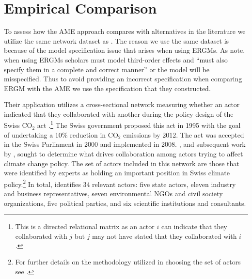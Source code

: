 \documentclass[12pt,pdflatex]{elsarticle}
\begin{document}
\section{\textbf{Empirical Comparison}} 

To assess how the AME approach compares with alternatives in the literature we utilize the same network dataset as \citet{cranmer:etal:2016}. The reason we use the same dataset is because of the model specification issue that arises when using ERGMs. As \citet[p. 8]{cranmer:etal:2016} note, when using ERGMs scholars must model third-order effects and ``must also specify them in a complete and correct manner'' or the model will be misspecified. Thus to avoid providing an incorrect specification when comparing ERGM with the AME we use the specification that they constructed. 

Their application utilizes a cross-sectional network measuring whether an actor indicated that they collaborated with another during the policy design of the Swiss CO$_{2}$ act \citep{ingold:2008}.\footnote{This is a directed relational matrix as an actor $i$ can indicate that they collaborated with $j$ but $j$ may not have stated that they collaborated with $i$.} The Swiss government proposed this act in 1995 with the goal of undertaking a 10\% reduction in CO$_{2}$ emissions by 2012. The act was accepted in the Swiss Parliament in 2000 and implemented in 2008. \citet{ingold:2008}, and subsequent work by \citet{ingold:fischer:2014}, sought to determine what drives collaboration among actors trying to affect climate change policy. The set of actors included in this network are those that were identified by experts as holding an important position in Swiss climate policy.\footnote{For further details on the methodology utilized in choosing the set of actors see \citet{ingold:2008,ingold:fischer:2014}.} In total, \citet{ingold:2008} identifies 34 relevant actors: five state actors, eleven industry and business representatives, seven environmental NGOs and civil society organizations, five political parties, and six scientific institutions and consultants. 
\end{document}
